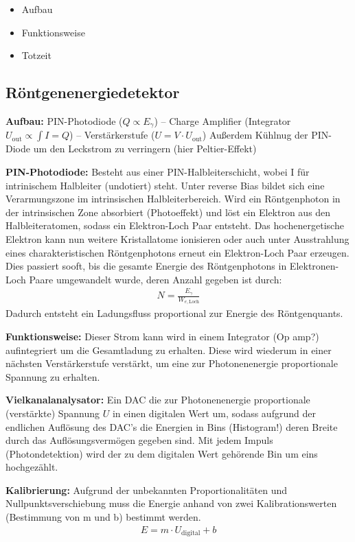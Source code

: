 \documentclass[10pt, a4paper]{article}
\begin{document}
\begin{itemize}
  \item Aufbau
  \item Funktionsweise
  \item Totzeit
\end{itemize}

\subsection{Röntgenenergiedetektor}
\textbf{Aufbau:} PIN-Photodiode ($Q \propto E_\gamma$) -- Charge Amplifier (Integrator $U_\mathrm{out} \propto \int I = Q$) -- Verstärkerstufe ($U = V \cdot U_\mathrm{out}$)
Außerdem Kühlnug der PIN-Diode um den Leckstrom zu verringern (hier Peltier-Effekt)

\textbf{PIN-Photodiode:} Besteht aus einer PIN-Halbleiterschicht, wobei I für intrinischem Halbleiter (undotiert) steht.
Unter reverse Bias bildet sich eine Verarmungszone im intrinsischen Halbleiterbereich.
Wird ein Röntgenphoton in der intrinsischen Zone absorbiert (Photoeffekt) und löst ein Elektron aus den Halbleiteratomen, sodass ein Elektron-Loch Paar entsteht.
Das hochenergetische Elektron kann nun weitere Kristallatome ionisieren oder auch unter Ausstrahlung eines charakteristischen Röntgenphotons erneut ein Elektron-Loch Paar erzeugen.
Dies passiert sooft, bis die gesamte Energie des Röntgenphotons in Elektronen-Loch Paare umgewandelt wurde, deren Anzahl gegeben ist durch:
\begin{align}
  N = \frac{E_\gamma}{W_{e,\mathrm{Loch}}}
\end{align}
Dadurch entsteht ein Ladungsfluss proportional zur Energie des Röntgenquants.

\textbf{Funktionsweise:} Dieser Strom kann wird in einem Integrator (Op amp?) aufintegriert um die Gesamtladung zu erhalten.
Diese wird wiederum in einer nächsten Verstärkerstufe verstärkt, um eine zur Photonenenergie proportionale Spannung zu erhalten.

\textbf{Vielkanalanalysator:} Ein DAC die zur Photonenenergie proportionale (verstärkte) Spannung $U$ in einen digitalen Wert um, sodass aufgrund der endlichen Auflösung des DAC's die Energien in Bins (Histogram!) deren Breite durch das Auflösungsvermögen gegeben sind.
Mit jedem Impuls (Photondetektion) wird der zu dem digitalen Wert gehörende Bin um eins hochgezählt.

\textbf{Kalibrierung:} Aufgrund der unbekannten Proportionalitäten und Nullpunktsverschiebung muss die Energie anhand von zwei Kalibrationswerten
(Bestimmung von m und b) bestimmt werden.
\begin{align}
  E = m \cdot U_\mathrm{digital} + b
\end{align}
\end{document}

